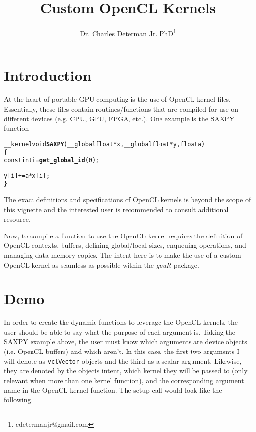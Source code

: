 \documentclass[12pt]{article}\usepackage[]{graphicx}\usepackage[]{color}
\makeatletter
\newcommand{\hlkwd}[1]{\textcolor[rgb]{0.737,0.353,0.396}{\textbf{#1}}}%
\newenvironment{kframe}{%
 \def\at@end@of@kframe{}%
 \ifinner\ifhmode%
  \def\at@end@of@kframe{\end{minipage}}%
  \begin{minipage}{\columnwidth}%
 \fi\fi%
 \def\FrameCommand##1{\hskip\@totalleftmargin \hskip-\fboxsep
 \colorbox{shadecolor}{##1}\hskip-\fboxsep
     \hskip-\linewidth \hskip-\@totalleftmargin \hskip\columnwidth}%
 \MakeFramed {\advance\hsize-\width
   \@totalleftmargin\z@ \linewidth\hsize
   \@setminipage}}%
 {\par\unskip\endMakeFramed%
 \at@end@of@kframe}
\newenvironment{knitrout}{}{} %
\newcommand{\Rpackage}[1]{\textsl{#1}}
\newcommand{\Rcode}[1]{\texttt{#1}}
\newcommand{\Rfunction}[1]{\Rcode{#1}}
\makeatother
\begin{document}
\title{Custom OpenCL Kernels}
\author{Dr. Charles Determan Jr. PhD\footnote{cdetermanjr@gmail.com}}
\newpage

\maketitle
\section{Introduction}
At the heart of portable GPU computing is the use of OpenCL kernel files.
Essentially, these files contain routines/functions that are compiled for use
on different devices (e.g. CPU, GPU, FPGA, etc.).  One example is the SAXPY
function


\begin{knitrout}
\color{fgcolor}\begin{kframe}
\begin{alltt}
__kernel void \hlkwd{SAXPY}(__global float* x, __global float* y, float a)
\{
    const int i = \hlkwd{get_global_id}(0);

    y [i] += a * x [i];
\}
\end{alltt}
\end{kframe}
\end{knitrout}

The exact definitions and specifications of OpenCL kernels is beyond the scope
of this vignette and the interested user is recommended to consult additional
resource.

Now, to compile a function to use the OpenCL kernel requires the definition of 
OpenCL contexts, buffers, defining global/local sizes, enqueuing operations, and 
managing data memory copies.  The intent here is to make the use of a custom OpenCL
kernel as seamless as possible within the \Rpackage{gpuR} package.

\newpage
\maketitle
\section{Demo}

In order to create the dynamic functions to leverage the OpenCL kernels,
the user should be able to say what the purpose of each argument is.
Taking the SAXPY example above, the user must know which arguments are device
objects (i.e. OpenCL buffers) and which aren't.  In this case, the first two
arguments I will denote as \Rfunction{vclVector} objects and the third as a scalar
argument.  Likewise, they are denoted by the objects intent, which kernel they
will be passed to (only relevant when more than one kernel function), and the
corresponding argument name in the OpenCL kernel function.  The setup call would
look like the following.
\end{document}
